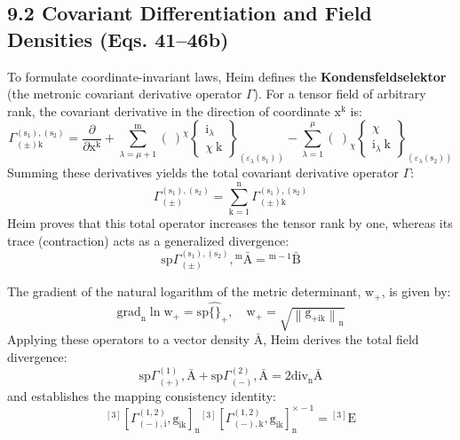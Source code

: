 \documentclass[12pt]{article}
\begin{document}
\subsection{9.2 Covariant Differentiation and Field Densities (Eqs. 41--46b)}
\label{sec:field_covariant_diff}

To formulate coordinate-invariant laws, Heim defines the \textbf{Kondensfeldselektor} (the metronic covariant derivative operator $\Gamma$). For a tensor field of arbitrary rank, the covariant derivative in the direction of coordinate $\mathrm{x^k}$ is:
\begin{equation}
\Gamma^{(\mathrm{s}_1), (\mathrm{s}_2)}_{(\pm)\mathrm{k}} = \frac{\partial}{\partial \mathrm{x^k}} + \sum_{\lambda=\mu+1}^{\mathrm{m}} (\ )^\chi \left\{ \begin{smallmatrix} \mathrm{i}_\lambda \\ \chi \ \mathrm{k} \end{smallmatrix} \right\}_{(\varepsilon_\lambda(\mathrm{s}_1))} - \sum_{\lambda=1}^{\mu} (\ )_\chi \left\{ \begin{smallmatrix} \chi \\ \mathrm{i}_\lambda \ \mathrm{k} \end{smallmatrix} \right\}_{(\varepsilon_\lambda(\mathrm{s}_2))} \tag{42}
\end{equation}
Summing these derivatives yields the total covariant derivative operator $\Gamma$:
\begin{equation}
\Gamma^{(\mathrm{s}_1), (\mathrm{s}_2)}_{(\pm)} = \sum_{\mathrm{k}=1}^\mathrm{n} \Gamma^{(\mathrm{s}_1), (\mathrm{s}_2)}_{(\pm)\mathrm{k}} \tag{42a}
\end{equation}
Heim proves that this total operator increases the tensor rank by one, whereas its trace (contraction) acts as a generalized divergence:
\begin{equation}
\mathrm{sp} \Gamma^{(\mathrm{s}_1), (\mathrm{s}_2)}_{(\pm)}, {}^\mathrm{m}\bar{\mathrm{A}} = {}^{\mathrm{m}-1}\bar{\mathrm{B}} \tag{43}
\end{equation}

The gradient of the natural logarithm of the metric determinant, $\mathrm{w}_+$, is given by:
\begin{equation}
\mathrm{grad}_\mathrm{n} \ln \mathrm{w}_+ = \mathrm{sp} \widehat{\{\}}_+, \quad \mathrm{w}_+ = \sqrt{\left\| \mathrm{g}_{+\mathrm{ik}} \right\|_\mathrm{n}} \tag{41}
\end{equation}
Applying these operators to a vector density $\bar{\mathrm{A}}$, Heim derives the total field divergence:
\begin{equation}
\mathrm{sp} \Gamma^{(1)}_{(+)}, \bar{\mathrm{A}} + \mathrm{sp} \Gamma^{(2)}_{(-)}, \bar{\mathrm{A}} = 2 \mathrm{div}_\mathrm{n} \bar{\mathrm{A}} \tag{46}
\end{equation}
and establishes the mapping consistency identity:
\begin{equation}
{}^{[3]}\left[ \Gamma^{(1,2)}_{(-),\mathrm{i}}, \mathrm{g}_{\mathrm{ik}} \right]_\mathrm{n} {}^{[3]}\left[ \Gamma^{(1,2)}_{(-),\mathrm{k}}, \mathrm{g}_{\mathrm{ik}} \right]_\mathrm{n}^{\times -1} = {}^{[3]}\mathrm{E} \tag{46b}
\end{equation}
\end{document}
